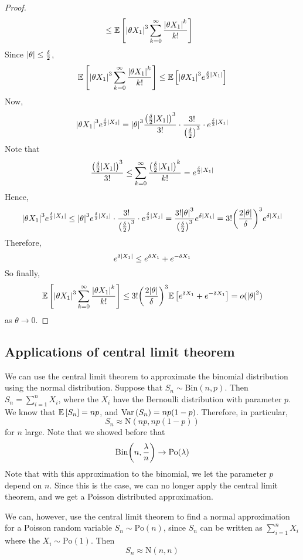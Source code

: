 \begin{proof}
\begin{align*}
		                                                          & \leq \mathbb{E}\left[{\abs{\theta X_1}^3 \sum_{k=0}^\infty \frac{\abs{\theta X_1}^k}{k!}}\right]
	\end{align*}
	Since \(\abs{\theta} \leq \frac{\delta}{2}\),
	\[
		\mathbb{E}\left[{\abs{\theta X_1}^3 \sum_{k=0}^\infty \frac{\abs{\theta X_1}^k}{k!}}\right] \leq \mathbb{E}\left[{\abs{\theta X_1}^3 e^{\frac{\delta}{2}\abs{X_1}}}\right]
	\]
	Now,
	\[
		\abs{\theta X_1}^3 e^{\frac{\delta}{2}\abs{X_1}} = \abs{\theta}^3 \frac{\qty(\frac{\delta}{2}\abs{X_1})^3}{3!} \cdot \frac{3!}{\qty(\frac{\delta}{2})^3} \cdot e^{\frac{\delta}{2}\abs{X_1}}
	\]
	Note that
	\[
		\frac{\qty(\frac{\delta}{2}\abs{X_1})^3}{3!} \leq \sum_{k=0}^\infty \frac{\qty(\frac{\delta}{2}\abs{X_1})^k}{k!} = e^{\frac{\delta}{2}\abs{X_1}}
	\]
	Hence,
	\[
		\abs{\theta X_1}^3 e^{\frac{\delta}{2}\abs{X_1}} \leq \abs{\theta}^3 e^{\frac{\delta}{2}\abs{X_1}} \cdot \frac{3!}{\qty(\frac{\delta}{2})^3} \cdot e^{\frac{\delta}{2}\abs{X_1}} = \frac{3!\abs{\theta}^3}{\qty(\frac{\delta}{2})^3}e^{\delta\abs{X_1}} = 3!\qty(\frac{2\abs{\theta}}{\delta})^3 e^{\delta \abs{X_1}}
	\]
	Therefore,
	\[
		e^{\delta \abs{X_1}} \leq e^{\delta X_1} + e^{-\delta X_1}
	\]
	So finally,
	\[
		\mathbb{E}\left[{\abs{\theta X_1}^3 \sum_{k=0}^\infty \frac{\abs{\theta X_1}^k}{k!}}\right] \leq 3!\qty(\frac{2\abs{\theta}}{\delta})^3 \mathbb{E}\left[{e^{\delta X_1} + e^{-\delta X_1}}\right] = o(\abs{\theta}^2)
	\]
	as \(\theta \to 0\).
\end{proof}

\subsection{Applications of central limit theorem}
We can use the central limit theorem to approximate the binomial distribution using the normal distribution.
Suppose that \(S_n \sim \mathrm{Bin}(n, p)\).
Then \(S_n = \sum_{i=1}^n X_i\), where the \(X_i\) have the Bernoulli distribution with parameter \(p\).
We know that \(\mathbb{E}\left[{S_n}\right] = np\), and \(\operatorname{Var}\left({S_n}\right) = np(1-p)\).
Therefore, in particular,
\[
	S_n \approx \mathrm{N}(np, np(1-p))
\]
for \(n\) large.
Note that we showed before that
\[
	\mathrm{Bin}\qty(n, \frac{\lambda}{n}) \to \mathrm{Po}(\lambda)
\]
Note that with this approximation to the binomial, we let the parameter \(p\) depend on \(n\).
Since this is the case, we can no longer apply the central limit theorem, and we get a Poisson distributed approximation.

We can, however, use the central limit theorem to find a normal approximation for a Poisson random variable \(S_n \sim \mathrm{Po}(n)\), since \(S_n\) can be written as \(\sum_{i=1}^n X_i\) where the \(X_i \sim \mathrm{Po}(1)\).
Then
\[
	S_n \approx \mathrm{N}(n, n)
\]

